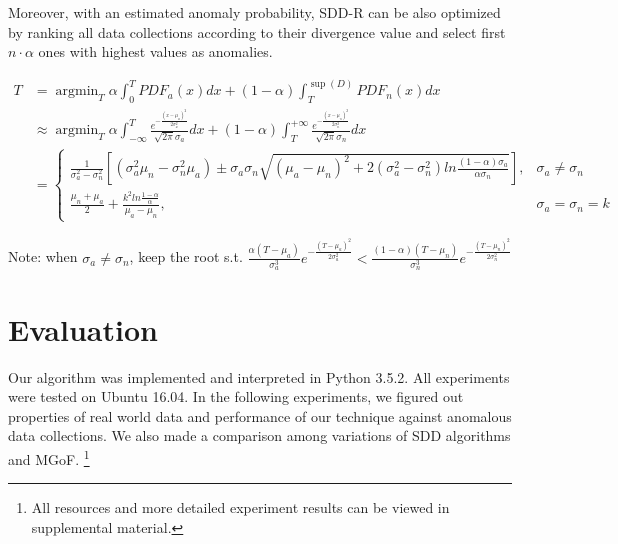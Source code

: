 \documentclass{article}
\begin{document}
			Moreover, with an estimated anomaly probability, SDD-R can be also optimized by ranking all data collections according to their divergence value and select first $n \cdot \alpha$ ones with highest values as anomalies.
			
			\begin{table}
				\footnotesize
				\begin{align}\label{equ:linear-weight}
				T & = \mathop{\arg\min}_{T} \alpha\int_{0}^{T}PDF_{a}(x)dx +
				(1-\alpha)\int_{T}^{\sup(D)}PDF_{n}(x)dx\nonumber\\
				& \approx \mathop{\arg\min}_{T}
				\alpha\int_{-\infty}^{T}
				\frac{e^{-\frac{(x - \mu_a)^2}{2\sigma_a^2}}}{\sqrt{2\pi} \sigma_a}dx
				+ 
				(1-\alpha)\int_{T}^{+\infty}
				\frac{e^{-\frac{(x - \mu_n)^2}{2\sigma_n^2}}}{\sqrt{2\pi} \sigma_n}dx\nonumber\\
				& = \begin{cases}
				\displaystyle
				\frac{1}{\sigma_a^2 - \sigma_n^2}\left[(\sigma_a^2\mu_n - \sigma_n^2\mu_a) \pm \sigma_a\sigma_n\sqrt{(\mu_a - \mu_n)^2 + 2(\sigma_a^2 - \sigma_n^2)ln\frac{(1 - \alpha)\sigma_a}{\alpha\sigma_n}}\right], & \sigma_a \ne \sigma_n\\
				\displaystyle
				\frac{\mu_n + \mu_a}{2} + \frac{k^2ln\frac{1 - \alpha}{\alpha}}{\mu_a - \mu_n}, & \sigma_a = \sigma_n = k
				\end{cases}
				\end{align}
				
				Note: when $\sigma_a \ne \sigma_n$, keep the root s.t. $\displaystyle \frac{\alpha (T - \mu_a)}{\sigma_a^3}e^{-\frac{(T - \mu_a)^2}{2\sigma_a^2}} < \frac{(1 - \alpha) (T - \mu_n)}{\sigma_n^3}e^{-\frac{(T - \mu_n)^2}{2\sigma_n^2}}$
			\end{table}
	
	\section{Evaluation}\label{sec:evaluation}
		Our algorithm was implemented and interpreted in Python 3.5.2. All experiments were tested on Ubuntu 16.04. In the following experiments, we figured out properties of real world data and performance of our technique against anomalous data collections. We also made a comparison among variations of SDD algorithms and MGoF.
		\footnote{All resources and more detailed experiment results can be viewed in supplemental material.}
	
\end{document}
